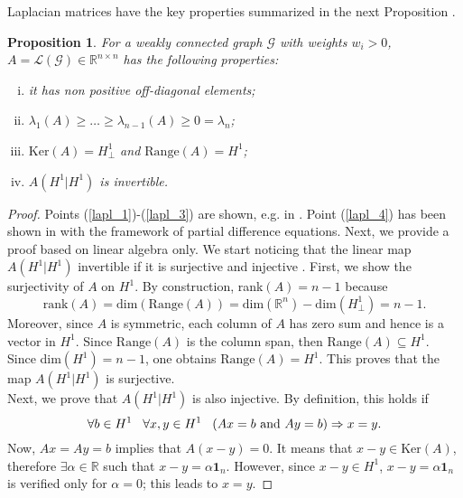 \documentclass[a4paper]{article}
\theoremstyle{plain}
\newtheorem{prp}{Proposition}
\newcommand{\Rset}{\mathbb{R}}
\newcommand{\mbf}[1]{\mathbf{#1}}                  \newcommand{\mbfgk}[1]{\boldsymbol{#1}}                  \newcommand{\One}{\textbf{1}}
\begin{document}
Laplacian matrices have the key properties summarized in the next
Proposition \cite{agaev2005spectra,godsil2001algebraic,bensoussan2005difference}.
\begin{prp}
	\label{pr:laplacian_prop}
	For a weakly connected graph $\mathcal{G}$ with weights $w_i>0$, $A = \mathcal{L}(\mathcal{G})\in\mathbb{R}^{n\times n}$ has the following properties:
	\begin{enumerate}[(i)]
		\item \label{lapl_1}it has non positive off-diagonal elements;
		\item \label{lapl_2} $\lambda_1(A)\geq\dots\geq\lambda_{n-1}(A)\geq 0 = \lambda_n$;
		\item \label{lapl_3} $\mathrm{Ker}(A)= H_{\perp}^1$ and $\mathrm{Range}(A)= H^1$;
		\item \label{lapl_4} $A(H^1|H^1)$ is invertible.
	\end{enumerate}
\end{prp}
\begin{proof}
	Points (\ref{lapl_1})-(\ref{lapl_3}) are shown, e.g. in \cite{agaev2005spectra, godsil2001algebraic}. Point (\ref{lapl_4}) has been shown in \cite{bensoussan2005difference} with the framework of partial difference equations. Next, we provide a proof based on linear algebra only. We start noticing that the linear map $A(H^1|H^1)$ invertible if it is surjective and injective \cite{lang1987linear}. First, we show the surjectivity of $A$ on $H^1$. By construction, rank$(A) = n-1$ because $$\text{rank}(A) = \mathrm{dim}(\mathrm{Range}(A))=\mathrm{dim}(\Rset^n)-\mathrm{dim}(H_{\perp}^1)=n-1.$$ Moreover, since $A$ is symmetric, each column of $A$ has zero sum and hence is a vector in $H^1$. Since $\mathrm{Range}(A)$ is the column span, then $\mathrm{Range}(A)\subseteq H^1$. Since dim$(H^1)=n-1$, one obtains $\mathrm{Range}(A)=H^1$. This proves that the map $A(H^1|H^1)$ is surjective. \\
	Next, we prove that $A(H^1|H^1)$ is also injective. By definition, this holds if
	\begin{equation*}
	\forall b\in H^1\hspace{3mm}\forall x,y \in H^1\hspace{3mm}(Ax=b \mbox{ and } Ay=b)\Rightarrow x=y.
	\end{equation*}
	Now, $Ax =Ay = b$ implies that $A(x-y) = 0$. It means that $x-y\in \mathrm{Ker}(A)$, therefore $\exists\alpha\in{\Rset}$ such that $x-y = \alpha \mbf{1}_n$. However, since $x-y\in H^1$, $x-y = \alpha \mbf{1}_n$ is verified only for $\alpha = 0$; this leads to $x = y$.  
\end{proof}
\end{document}
